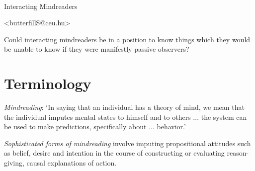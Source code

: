 \documentclass[11pt]{extarticle}
\date{}
\begin{document}
\begin{multicols}{3}

\setlength\footnotesep{1em}






\

\begin{center}
{
\Large{Interacting Mindreaders}
}



<butterfillS@ceu.hu>

\end{center}

Could interacting mindreaders be in a position to know things which they would be unable to know if they were manifestly passive observers? 



\section{Terminology}
\emph{Mindreading}: `In saying that an individual has a theory of mind, we mean that the individual imputes mental states to himself and to others ... the system can be used to make predictions, specifically about ... behavior.'\citep{premack_does_1978} %

\emph{Sophisticated forms of mindreading} involve imputing propositional attitudes such as belief, desire and intention in the course of constructing or evaluating  reason-giving, causal explanations of action.

%
%



\end{multicols}
\end{document}
